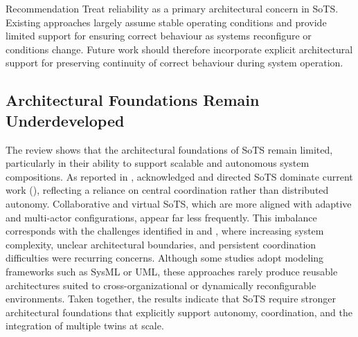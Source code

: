 \begin{recoframe}{Recommendation}
Treat reliability as a primary architectural concern in SoTS. Existing approaches largely assume stable operating conditions and provide limited support for ensuring correct behaviour as systems reconfigure or conditions change. Future work should therefore incorporate explicit architectural support for preserving continuity of correct behaviour during system operation.
\end{recoframe}






\subsection*{Architectural Foundations Remain Underdeveloped}

The review shows that the architectural foundations of SoTS remain limited, particularly in their ability to support scalable and autonomous system compositions. As reported in , acknowledged and directed SoTS dominate current work (), reflecting a reliance on central coordination rather than distributed autonomy. Collaborative and virtual SoTS, which are more aligned with adaptive and multi-actor configurations, appear far less frequently. This imbalance corresponds with the challenges identified in  and , where increasing system complexity, unclear architectural boundaries, and persistent coordination difficulties were recurring concerns. Although some studies adopt modeling frameworks such as SysML or UML, these approaches rarely produce reusable architectures suited to cross-organizational or dynamically reconfigurable environments. Taken together, the results indicate that SoTS require stronger architectural foundations that explicitly support autonomy, coordination, and the integration of multiple twins at scale.

